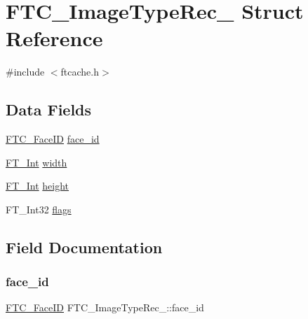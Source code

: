 \hypertarget{struct_f_t_c___image_type_rec__}{}\section{F\+T\+C\+\_\+\+Image\+Type\+Rec\+\_\+ Struct Reference}
\label{struct_f_t_c___image_type_rec__}


{\ttfamily \#include $<$ftcache.\+h$>$}

\subsection*{Data Fields}
\begin{DoxyCompactItemize}
\item 
\hyperlink{ftcache_8h_a5da66c12c497bf5888638100876c7197}{F\+T\+C\+\_\+\+Face\+ID} \hyperlink{struct_f_t_c___image_type_rec___a9851b8d4a06baacd18d5b9856fd85abd}{face\+\_\+id}
\item 
\hyperlink{fttypes_8h_af90e5fb0d07e21be9fe6faa33f02484c}{F\+T\+\_\+\+Int} \hyperlink{struct_f_t_c___image_type_rec___af1a4cccbabb0f5852ed755a12ed08dd8}{width}
\item 
\hyperlink{fttypes_8h_af90e5fb0d07e21be9fe6faa33f02484c}{F\+T\+\_\+\+Int} \hyperlink{struct_f_t_c___image_type_rec___adb56a9d18a3f522d713d0ba01c1a8778}{height}
\item 
F\+T\+\_\+\+Int32 \hyperlink{struct_f_t_c___image_type_rec___a391782ed8c67de86591c71f276ea6454}{flags}
\end{DoxyCompactItemize}


\subsection{Field Documentation}
\mbox{\label{struct_f_t_c___image_type_rec___a9851b8d4a06baacd18d5b9856fd85abd}} 
\subsubsection{\texorpdfstring{face\+\_\+id}{face\_id}}
{\footnotesize\ttfamily \hyperlink{ftcache_8h_a5da66c12c497bf5888638100876c7197}{F\+T\+C\+\_\+\+Face\+ID} F\+T\+C\+\_\+\+Image\+Type\+Rec\+\_\+\+::face\+\_\+id}

